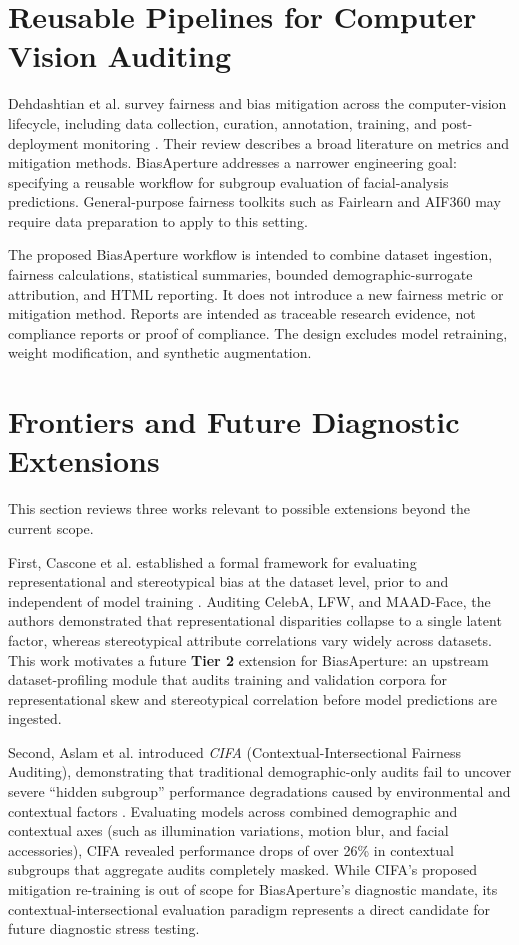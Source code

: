 \section{Reusable Pipelines for Computer Vision Auditing}
\label{sec:lit_workflow_gap}

Dehdashtian et al. survey fairness and bias mitigation across the computer-vision lifecycle, including data collection, curation, annotation, training, and post-deployment monitoring \cite{dehdashtian2024survey}. Their review describes a broad literature on metrics and mitigation methods. BiasAperture addresses a narrower engineering goal: specifying a reusable workflow for subgroup evaluation of facial-analysis predictions. General-purpose fairness toolkits such as Fairlearn and AIF360 may require data preparation to apply to this setting.

The proposed BiasAperture workflow is intended to combine dataset ingestion, fairness calculations, statistical summaries, bounded demographic-surrogate attribution, and HTML reporting. It does not introduce a new fairness metric or mitigation method. Reports are intended as traceable research evidence, not compliance reports or proof of compliance. The design excludes model retraining, weight modification, and synthetic augmentation.


\section{Frontiers and Future Diagnostic Extensions}
\label{sec:lit_future_frontiers}

This section reviews three works relevant to possible extensions beyond the current scope.

First, Cascone et al. established a formal framework for evaluating representational and stereotypical bias at the dataset level, prior to and independent of model training \cite{cascone2026framework}. Auditing CelebA, LFW, and MAAD-Face, the authors demonstrated that representational disparities collapse to a single latent factor, whereas stereotypical attribute correlations vary widely across datasets. This work motivates a future \textbf{Tier 2} extension for BiasAperture: an upstream dataset-profiling module that audits training and validation corpora for representational skew and stereotypical correlation before model predictions are ingested.

Second, Aslam et al. introduced \emph{CIFA} (Contextual-Intersectional Fairness Auditing), demonstrating that traditional demographic-only audits fail to uncover severe ``hidden subgroup'' performance degradations caused by environmental and contextual factors \cite{aslam2026cifa}. Evaluating models across combined demographic and contextual axes (such as illumination variations, motion blur, and facial accessories), CIFA revealed performance drops of over 26\% in contextual subgroups that aggregate audits completely masked. While CIFA's proposed mitigation re-training is out of scope for BiasAperture's diagnostic mandate, its contextual-intersectional evaluation paradigm represents a direct candidate for future diagnostic stress testing.

